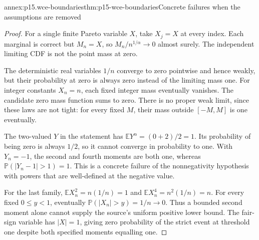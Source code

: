 \begin{annexitem}{annex:p15.wce-boundaries}{thm:p15-wce-boundaries}{Concrete failures when the assumptions are removed}
\begin{proof}
For a single finite Pareto variable \(X\), take \(X_j=X\)
at every index. Each marginal is correct but \(M_n=X\),
so \(M_n/n^{1/\alpha}\to0\) almost surely.
The independent limiting CDF is not the point mass at zero.

The deterministic real variables \(1/n\) converge to zero
pointwise and hence weakly, but their probability at zero
is always zero instead of the limiting mass one.
For integer constants \(X_n=n\), each fixed integer mass
eventually vanishes. The candidate zero mass function sums
to zero. There is no proper weak limit, since these laws
are not tight: for every fixed \(M\), their mass outside
\([-M,M]\) is one eventually.

The two-valued \(Y\) in the statement has
\(\mathbb EY^\alpha=(0+2)/2=1\).
Its probability of being zero is always \(1/2\), so it
cannot converge in probability to one.
With \(Y_n=-1\), the second and fourth moments are both one,
whereas \(\mathbb P(|Y_n-1|>1)=1\).
This is a concrete failure of the nonnegativity hypothesis
with powers that are well-defined at the negative value.

For the last family,
\(\mathbb EX_n^2=n(1/n)=1\) and
\(\mathbb EX_n^4=n^2(1/n)=n\).
For every fixed \(0\leq y<1\), eventually
\(\mathbb P(|X_n|>y)=1/n\to0\).
Thus a bounded second moment alone cannot supply the source's
uniform positive lower bound.
The fair-sign variable has \(|X|=1\), giving zero probability
of the strict event at threshold one despite both specified
moments equalling one.
\end{proof}
\end{annexitem}
